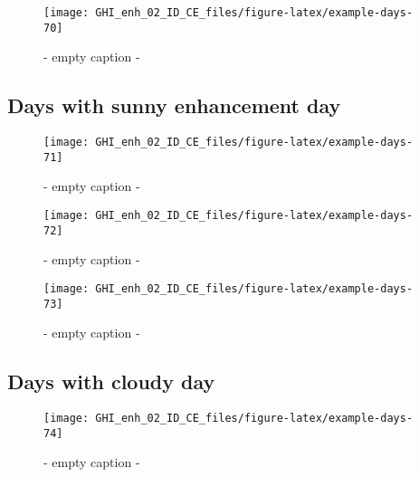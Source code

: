 \documentclass[
  10pt,
  a4paper,oneside]{article}
\begin{document}
\begin{figure}[H]

{\centering \texttt{[image: GHI\_enh\_02\_ID\_CE\_files/figure-latex/example-days-70]} 

}

\caption{ - empty caption - }\label{fig:example-days-70}
\end{figure}

\FloatBarrier

\hypertarget{days-with-sunny-enhancement-day}{%
\subsection{Days with sunny enhancement day}\label{days-with-sunny-enhancement-day}}

\begin{figure}[H]

{\centering \texttt{[image: GHI\_enh\_02\_ID\_CE\_files/figure-latex/example-days-71]} 

}

\caption{ - empty caption - }\label{fig:example-days-71}
\end{figure}

\begin{figure}[H]

{\centering \texttt{[image: GHI\_enh\_02\_ID\_CE\_files/figure-latex/example-days-72]} 

}

\caption{ - empty caption - }\label{fig:example-days-72}
\end{figure}

\begin{figure}[H]

{\centering \texttt{[image: GHI\_enh\_02\_ID\_CE\_files/figure-latex/example-days-73]} 

}

\caption{ - empty caption - }\label{fig:example-days-73}
\end{figure}

\FloatBarrier

\hypertarget{days-with-cloudy-day}{%
\subsection{Days with cloudy day}\label{days-with-cloudy-day}}

\begin{figure}[H]

{\centering \texttt{[image: GHI\_enh\_02\_ID\_CE\_files/figure-latex/example-days-74]} 

}

\caption{ - empty caption - }\label{fig:example-days-74}
\end{figure}
\end{document}
